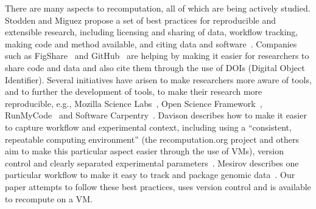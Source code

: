 There are many aspects to recomputation, all of which are being actively
studied. Stodden and Miguez propose a set of best practices for reproducible and
extensible research, including licensing and sharing of data, workflow tracking,
making code and method available, and citing data and
software~\cite{stodden:practices}. Companies such as
FigShare~\cite{figshare:citable} and GitHub~\cite{github:citable} are helping by
making it easier for researchers to share code and data and also cite them
through the use of DOIs (Digital Object Identifier). Several initiatives have
arisen to make researchers more aware of tools, and to further the development
of tools, to make their research more reproducible, e.g., Mozilla Science
Labs~\cite{mozillasciencelabs},
Open Science Framework~\cite{openscienceframework},
RunMyCode~\cite{runmycode}
and Software Carpentry~\cite{softwarecarpentry}.
Davison describes how
to make it easier to capture workflow and experimental context, including using
a ``consistent, repeatable computing environment'' (the recomputation.org
project and others~\cite{howe:reproducible} aim to make this particular aspect
easier through the use of VMs), version control and clearly
separated experimental parameters~\cite{davison:reproducibility}. Mesirov
describes one particular workflow to make it easy to track and package genomic
data~\cite{mesirov:accessible}. Our paper attempts to follow these best
practices, uses version control and is available to recompute on a VM.

%
%
